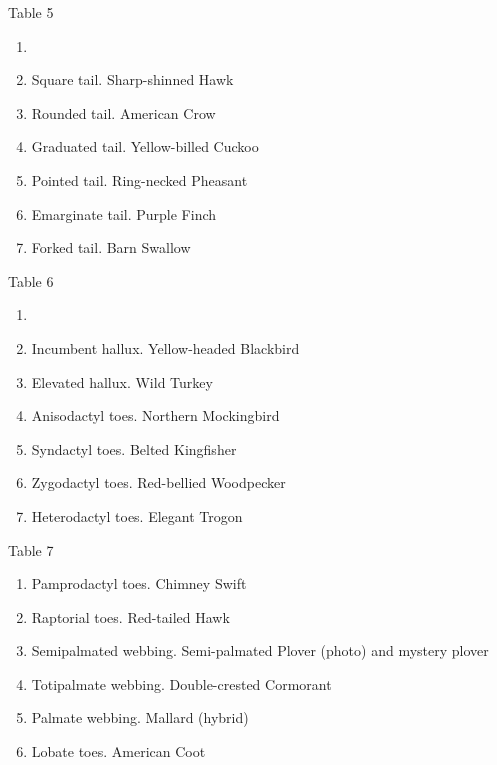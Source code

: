 \documentclass[10pt]{article}
\begin{document}
\begin{multicols}{2}
Table 5
\begin{enumerate}[resume]
\item \item  Square tail. Sharp-shinned Hawk
\item  Rounded tail. American Crow
\item  Graduated tail. Yellow-billed Cuckoo
\item  Pointed tail. Ring-necked Pheasant
\item  Emarginate tail. Purple Finch
\item  Forked tail. Barn Swallow
\end{enumerate}

Table 6
\begin{enumerate}[resume]
\item \item  Incumbent hallux. Yellow-headed Blackbird
\item  Elevated hallux. Wild Turkey
\item  Anisodactyl toes. Northern Mockingbird
\item  Syndactyl toes. Belted Kingfisher
\item  Zygodactyl toes. Red-bellied Woodpecker
\item  Heterodactyl toes. Elegant Trogon
\end{enumerate}

Table 7
\begin{enumerate}[resume]
\item Pamprodactyl toes. Chimney Swift
\item  Raptorial toes. Red-tailed Hawk
\item  Semipalmated webbing. Semi-palmated Plover (photo) and mystery plover
\item  Totipalmate webbing. Double-crested Cormorant
\item  Palmate webbing. Mallard (hybrid)
\item  Lobate toes. American Coot
\end{enumerate}

\end{multicols}
\end{document}
